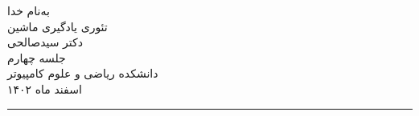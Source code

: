\begin{minipage}{0.1\textwidth}
\end{minipage}%
\hfill%
\begin{minipage}{0.6\textwidth}\centering
\fontsize{10pt}{10pt}\selectfont
به‌نام خدا \\
تئوری یادگیری ماشین \\
دکتر سیدصالحی \\
جلسه چهارم \\
\vspace{0.25cm}
\begingroup
\fontsize{8pt}{8pt}\selectfont
دانشکده ریاضی و علوم کامپیوتر \\
اسفند ماه ۱۴۰۲\\
\endgroup
\end{minipage}%
\hfill%
\begin{minipage}{0.1\textwidth}
\end{minipage}

\vspace{0.5cm}

\noindent\rule{\textwidth}{1pt}
